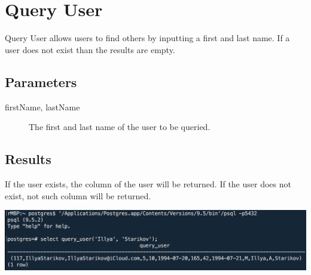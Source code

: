 \section{Query User}
Query User allows users to find others by inputting a first and last name. If a user does not exist than the results are empty.

\subsection*{Parameters}
\begin{description}
    \item [firstName, lastName] The first and last name of the user to be queried.
\end{description}

\subsection*{Results}
If the user exists, the column of the user will be returned. If the user does not exist, not such column will be returned.

\begin{center}
\includegraphics[width=\columnwidth]{include/assets/screenshots/query_user}
\end{center}